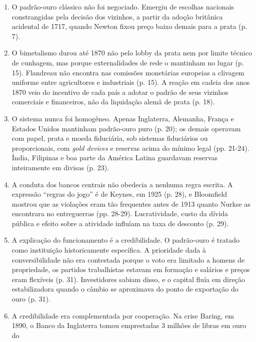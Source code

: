 \begin{enumerate}[leftmargin=*,nosep]
\item O padrão-ouro clássico não foi negociado. Emergiu de escolhas nacionais
constrangidas pela decisão dos vizinhos, a partir da adoção britânica acidental
de 1717, quando Newton fixou preço baixo demais para a prata (p. 7).
\item O bimetalismo durou até 1870 não pelo lobby da prata nem por limite
técnico de cunhagem, mas porque externalidades de rede o mantinham no lugar
(p. 15). Flandreau não encontra nas comissões monetárias europeias a clivagem
uniforme entre agricultores e industriais (p. 15). A reação em cadeia dos anos
1870 veio do incentivo de cada país a adotar o padrão de seus vizinhos
comerciais e financeiros, não da liquidação alemã de prata (p. 18).
\item O sistema nunca foi homogêneo. Apenas Inglaterra, Alemanha, França e
Estados Unidos mantinham padrão-ouro puro (p. 20); os demais operavam com papel,
prata e moeda fiduciária, sob sistemas fiduciários ou proporcionais, com
\emph{gold devices} e reservas acima do mínimo legal (pp. 21-24). Índia,
Filipinas e boa parte da América Latina guardavam reservas inteiramente em
divisas (p. 23).
\item A conduta dos bancos centrais não obedecia a nenhuma regra escrita. A
expressão ``regras do jogo'' é de Keynes, em 1925 (p. 28), e Bloomfield mostrou
que as violações eram tão frequentes antes de 1913 quanto Nurkse as encontrara
no entreguerras (pp. 28-29). Lucratividade, custo da dívida pública e efeito
sobre a atividade influíam na taxa de desconto (p. 29).
\item A explicação do funcionamento é a credibilidade. O padrão-ouro é tratado
como instituição historicamente específica.
A prioridade dada à conversibilidade não era contestada porque o voto era
limitado a homens de propriedade, os partidos trabalhistas estavam em formação e
salários e preços eram flexíveis (p. 31). Investidores sabiam disso, e o capital
fluía em direção estabilizadora quando o câmbio se aproximava do ponto de
exportação do ouro (p. 31).
\item A credibilidade era complementada por cooperação. Na crise Baring, em
1890, o Banco da Inglaterra tomou emprestadas 3 milhões de libras em ouro do

\end{enumerate}
